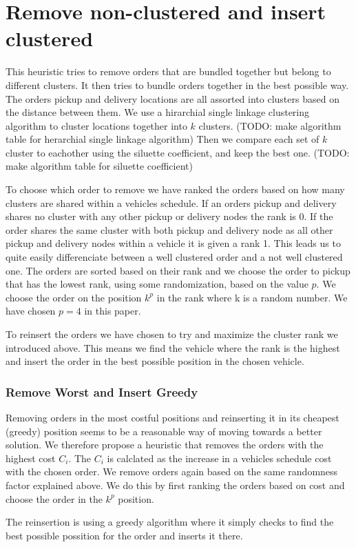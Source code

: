 \documentclass[../main.tex]{subfiles}
\begin{document}
\section{Remove non-clustered and insert clustered}
\label{sec:clust}
This heuristic tries to remove orders that are bundled together but belong to different clusters. It then tries to bundle orders together in the best possible way.
The orders pickup and delivery locations are all assorted into clusters based on the distance between them. 
We use a hirarchial single linkage clustering algorithm to cluster locations together into $k$ clusters. (TODO: make algorithm table for herarchial single linkage algorithm) 
Then we compare each set of $k$ cluster to eachother using the siluette coefficient, and keep the best one. (TODO: make algorithm table for siluette coefficient) \newlinw \par
To choose which order to remove we have ranked the orders based on how many clusters are shared within a vehicles schedule.
If an orders pickup and delivery shares no cluster with any other pickup or delivery nodes the rank is 0. 
If the order shares the same cluster with both pickup and delivery node as all other pickup and delivery nodes within a vehicle it is given a rank 1.  
This leads us to quite easily differenciate between a well clustered order and a not well clustered one.
The orders are sorted based on their rank and we choose the order to pickup that has the lowest rank, using some randomization, based on the value $p$. 
We choose the order on the position $k^p$ in the rank where k is a random number. 
We have chosen $p=4$ in this paper.  \newline \par
To reinsert the orders we have chosen to try and maximize the cluster rank we introduced above. This means we find the vehicle where the rank is the highest and insert the order in the best possible position in the chosen vehicle. 

\subsubsection{Remove Worst and Insert Greedy}
\label{sec:greedy}
Removing orders in the most costful positions and reinserting it in its cheapest (greedy) position seems to be a reasonable way of moving towards a better solution.
We therefore propose a heuristic that removes the orders with the highest cost $C_{i}$.
The $C_i$ is calclated as the increase in a vehicles schedule cost with the chosen order.
We remove orders again based on the same randomness factor explained above. We do this by first ranking the orders based on cost and choose the order in the $k^p$ position. \newline \par
The reinsertion is using a greedy algorithm where it simply checks to find the best possible possition for the order and inserts it there. 
\end{document}
